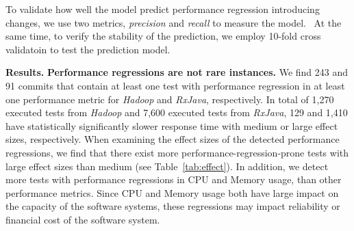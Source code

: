 To validate how well the model predict performance regression introducing changes, we use two metrics, \emph{precision} and \emph{recall} to measure the model.  At the same time, to verify the stability of the prediction, we employ 10-fold cross validatoin to test the prediction model.

 \textbf{Results.}
\textbf{Performance regressions are not rare instances.} We find 243 and 91 commits that contain at least one test with performance regression in at least one performance metric for \emph{Hadoop} and \emph{RxJava}, respectively. In total of 1,270 executed tests from \emph{Hadoop} and 7,600 executed tests from \emph{RxJava}, 129 and 1,410 have statistically significantly slower response time with medium or large effect sizes, respectively. When examining the effect sizes of the detected performance regressions, we find that there exist more performance-regression-prone tests with large effect sizes than medium (see Table~\ref{tab:effect}). In addition, we detect more tests with performance regressions in CPU and Memory usage, than other performance metrics. Since CPU and Memory usage both have large impact on the capacity of the software systems, these regressions may impact reliability or financial cost of the software system. 
